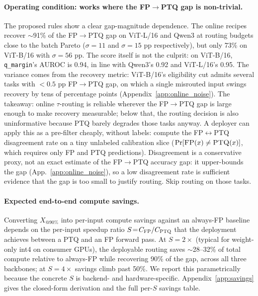 \documentclass{article}
\makeatletter
\newcommand{\fp}{\textsc{FP}\xspace}
\newcommand{\ptq}{\textsc{PTQ}\xspace}
\newcommand{\xat}[1]{\ensuremath{X_{@#1\%}}}
\makeatother
\begin{document}
\paragraph{Operating condition: works where the \fp$\to$\ptq{} gap is non-trivial.}
The proposed rules show a clear gap-magnitude dependence. The online recipes recover $\sim$91\% of the \fp$\to$\ptq{} gap on ViT-L/16 and Qwen3 at routing budgets close to the batch Pareto ($\sigma\!=\!11$ and $\sigma\!=\!15$ pp respectively), but only 73\% on ViT-B/16 with $\sigma\!=\!56$ pp. The score itself is not the culprit: on ViT-B/16, \texttt{q\_margin}'s AUROC is 0.94, in line with Qwen3's 0.92 and ViT-L/16's 0.95. The variance comes from the recovery metric: ViT-B/16's eligibility cut admits several tasks with $<\!0.5$ pp FP$\to$PTQ gap, on which a single misrouted input swings recovery by tens of percentage points (Appendix~\ref{app:online_noise}). The takeaway: online $\tau$-routing is reliable wherever the FP$\to$PTQ gap is large enough to make recovery measurable; below that, the routing decision is also uninformative because PTQ barely degrades those tasks anyway. A deployer can apply this as a pre-filter cheaply, without labels: compute the \fp{}$\leftrightarrow$\ptq{} disagreement rate on a tiny unlabeled calibration slice ($\Pr[\fp(x) \neq \ptq(x)]$, which requires only FP and PTQ predictions). Disagreement is a conservative proxy, not an exact estimate of the \fp$\to$\ptq{} accuracy gap: it upper-bounds the gap (App.~\ref{app:online_noise}), so a low disagreement rate is sufficient evidence that the gap is too small to justify routing. Skip routing on those tasks.

\paragraph{Expected end-to-end compute savings.}
\label{sec:savings}
Converting \xat{90} into per-input compute savings against an always-\fp{} baseline depends on the per-input speedup ratio $S \!=\! C_{\fp{}} / C_{\ptq{}}$ that the deployment achieves between a \ptq{} and an \fp{} forward pass. At $S \!=\! 2\times$ (typical for weight-only int4 on consumer GPUs), the deployable routing saves $\sim$28--32\% of total compute relative to always-\fp{} while recovering 90\% of the gap, across all three backbones; at $S \!=\! 4\times$ savings climb past 50\%. We report this parametrically because the concrete $S$ is backend- and hardware-specific. Appendix~\ref{app:savings} gives the closed-form derivation and the full per-$S$ savings table.
\end{document}
